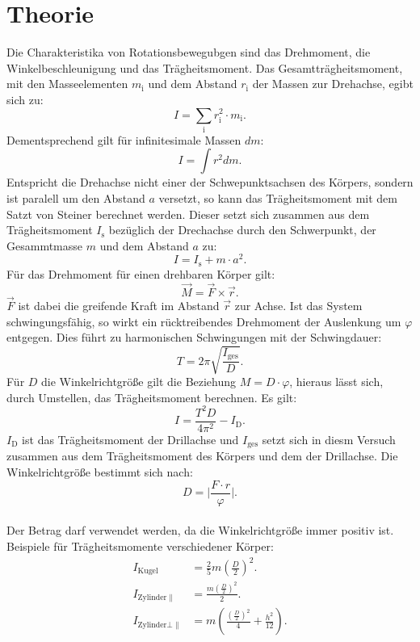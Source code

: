 \section{Theorie}
\label{sec:Theorie}

Die Charakteristika von Rotationsbewegubgen sind das Drehmoment,
die Winkelbeschleunigung und das Trägheitsmoment.
Das Gesamtträgheitsmoment, mit den Masseelementen $m_{\mathrm{i}}$ und dem Abstand $r_{\mathrm{i}}$
der Massen zur Drehachse, egibt sich zu:
\begin{equation}
  I=\sum_{\mathrm{i}} r_{\mathrm{i}}^2\cdot m_{\mathrm{i}}.
\end{equation}
Dementsprechend gilt für infinitesimale Massen $dm$:
\begin{equation}
  I=\int r^2dm.
\end{equation}
Entspricht die Drehachse nicht einer der Schwepunktsachsen des Körpers, sondern
ist paralell um den Abstand $a$ versetzt, so kann das Trägheitsmoment mit dem Satzt
von Steiner berechnet werden. Dieser setzt sich zusammen aus dem Trägheitsmoment $I_{\mathrm{s}}$
bezüglich der Drechachse durch den Schwerpunkt, der Gesammtmasse $m$ und dem Abstand $a$
zu:
\begin{equation}
  I=I_{\mathrm{s}}+m\cdot a^2.
\end{equation}
Für das Drehmoment für einen drehbaren Körper gilt:
\begin{equation}
 \vec{M}=\vec{F}\times\vec{r}.
\end{equation}
$\vec{F}$ ist dabei die greifende Kraft im Abstand $\vec{r}$ zur Achse.
Ist das System schwingungsfähig, so wirkt ein rücktreibendes Drehmoment
der Auslenkung um $\varphi$ entgegen. Dies führt zu harmonischen Schwingungen
mit der Schwingdauer:
\begin{equation}
  T=2\pi\sqrt{\frac{I_{\mathrm{{ges}}}}{D}}.
\end{equation}
Für $D$ die Winkelrichtgröße gilt die Beziehung $M=D\cdot\varphi$, hieraus lässt
sich, durch Umstellen, das Trägheitsmoment berechnen.
Es gilt:
\begin{equation}
 I=\frac{T^2 D}{4\pi^2}-I_{\mathrm{D}}.\label{eqn:I}
\end{equation}
$I_{\mathrm{D}}$ ist das Trägheitsmoment der Drillachse und $I_{\mathrm{ges}}$ setzt sich in diesm Versuch zusammen aus dem Trägheitsmoment des Körpers und dem der Drillachse.
Die Winkelrichtgröße bestimmt sich nach:
\begin{equation}
  D=\bigl|\frac{F\cdot r}{\varphi}\bigr|. \label{eqn:D}
\end{equation}\\
Der Betrag darf verwendet werden, da die Winkelrichtgröße immer positiv ist.
Beispiele für Trägheitsmomente verschiedener Körper:
\begin{align}
  I_{\mathrm{Kugel}}&=\frac{2}{5} m (\frac{D}{2})^2.\label{eqn:Kugel}\\
  I_{\mathrm{Zylinder\parallel}}&=\frac{m(\frac{D}{2})^2}{2}\label{eqn:zs}.\\
  I_{\mathrm{Zylinder\bot\parallel}}&=m\left(\frac{(\frac{D}{2})^2}{4}+\frac{h^2}{12}\right).\label{eqn:zl}
\end{align}
